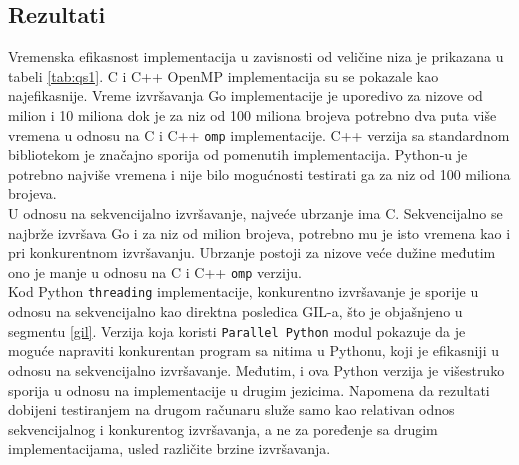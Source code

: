 \documentclass[12pt,oneside]{memoir}
\begin{document}
\subsection{Rezultati}\label{qs:rez}

Vremenska efikasnost implementacija u zavisnosti od veličine niza je prikazana u tabeli \ref{tab:qs1}.  C i C++ OpenMP implementacija su se pokazale kao najefikasnije. Vreme izvršavanja Go implementacije je uporedivo za nizove od milion i 10 miliona dok je za niz od 100 miliona brojeva potrebno dva puta više vremena u odnosu na C i C++ \texttt{omp} implementacije. C++ verzija sa standardnom bibliotekom je značajno sporija od pomenutih implementacija. Python-u je potrebno najviše vremena i nije bilo mogućnosti testirati ga za niz od 100 miliona brojeva.
\\

U odnosu na sekvencijalno izvršavanje, najveće ubrzanje ima C. Sekvencijalno se najbrže izvršava Go i za niz od milion brojeva, potrebno mu je isto vremena kao i pri konkurentnom izvršavanju.  Ubrzanje postoji za nizove veće dužine međutim ono je manje u odnosu na C i C++ \texttt{omp} verziju. 
\\

Kod Python \texttt{threading} implementacije, konkurentno izvršavanje je sporije u odnosu na sekvencijalno kao direktna posledica GIL-a, što je objašnjeno u segmentu \ref{gil}. Verzija koja koristi \texttt{Parallel Python} modul pokazuje da je moguće napraviti konkurentan program sa nitima u Pythonu, koji je efikasniji u odnosu na sekvencijalno izvršavanje. Međutim, i ova Python verzija je višestruko sporija u odnosu na implementacije u drugim jezicima. Napomena da rezultati dobijeni testiranjem na drugom računaru služe samo kao relativan odnos sekvencijalnog i konkurentog izvršavanja, a ne za poređenje sa drugim implementacijama, usled različite brzine izvršavanja.
\\
\end{document}
